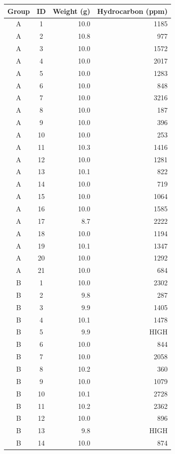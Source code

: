 \documentclass{article}
\begin{document}
\begin{table}[h!]
	\begin{center}
		\begin{tabular}{c|c|rr}
			\textbf{Group} & \textbf{ID} & \textbf{Weight (g)} & \textbf{Hydrocarbon (ppm)} \\ \hline
			A & 1 & 10.0 & 1185 \\
			A & 2 & 10.8 & 977 \\
			A & 3 & 10.0 & 1572 \\
			A & 4 & 10.0 & 2017 \\
			A & 5 & 10.0 & 1283 \\
			A & 6 & 10.0 & 848 \\
			A & 7 & 10.0 & 3216 \\
			A & 8 & 10.0 & 187 \\
			A & 9 & 10.0 & 396 \\
			A & 10 & 10.0 & 253 \\
			A & 11 & 10.3 & 1416 \\
			A & 12 & 10.0 & 1281 \\
			A & 13 & 10.1 & 822 \\
			A & 14 & 10.0 & 719 \\
			A & 15 & 10.0 & 1064 \\
			A & 16 & 10.0 & 1585 \\
			A & 17 & 8.7 & 2222 \\
			A & 18 & 10.0 & 1194 \\
			A & 19 & 10.1 & 1347 \\
			A & 20 & 10.0 & 1292 \\
			A & 21 & 10.0 & 684 \\ \hline
			B & 1 & 10.0 & 2302 \\
			B & 2 & 9.8 & 287 \\
			B & 3 & 9.9 & 1405 \\
			B & 4 & 10.1 & 1478 \\
			B & 5 & 9.9 & HIGH \\
			B & 6 & 10.0 & 844 \\
			B & 7 & 10.0 & 2058 \\
			B & 8 & 10.2 & 360 \\
			B & 9 & 10.0 & 1079 \\
			B & 10 & 10.1 & 2728 \\
			B & 11 & 10.2 & 2362 \\
			B & 12 & 10.0 & 896 \\
			B & 13 & 9.8 & HIGH \\
			B & 14 & 10.0 & 874 \\

\end{tabular}
\end{center}
\end{table}
\end{document}
